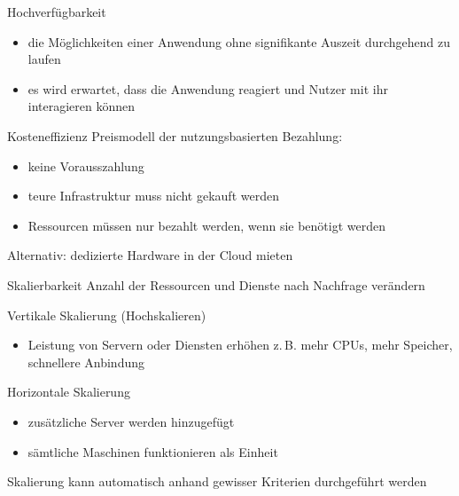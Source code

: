 
\begin{flashcard}[Definition]{Hochverfügbarkeit}
    \begin{itemize}
        \item die Möglichkeiten einer Anwendung ohne signifikante Auszeit durchgehend zu laufen
        \item es wird erwartet, dass die Anwendung reagiert und Nutzer mit ihr interagieren können
    \end{itemize}
\end{flashcard}

\begin{flashcard}[Definition]{Kosteneffizienz}
    Preismodell der nutzungsbasierten Bezahlung:
    \begin{itemize}
        \item keine Vorausszahlung
        \item teure Infrastruktur muss nicht gekauft werden
        \item Ressourcen müssen nur bezahlt werden, wenn sie benötigt werden
    \end{itemize}

    \vspace{5mm}
    Alternativ: dedizierte Hardware in der Cloud mieten
\end{flashcard}

\begin{flashcard}[Definition]{Skalierbarkeit}
    Anzahl der Ressourcen und Dienste nach Nachfrage verändern

    \vspace{5mm}
    Vertikale Skalierung (Hochskalieren)
    \begin{itemize}
        \item Leistung von Servern oder Diensten erhöhen\newline
        z.\,B. mehr CPUs, mehr Speicher, schnellere Anbindung
    \end{itemize}

    Horizontale Skalierung
    \begin{itemize}
        \item zusätzliche Server werden hinzugefügt
        \item sämtliche Maschinen funktionieren als Einheit
    \end{itemize}

    \vspace{5mm}
    Skalierung kann automatisch anhand gewisser Kriterien durchgeführt werden
\end{flashcard}

